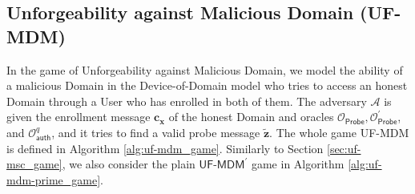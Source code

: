 \subsection{Unforgeability against Malicious Domain (UF-MDM)}
\label{sec:uf-mdm_game}

In the game of Unforgeability against Malicious Domain, we model the ability of a malicious \textsf{Domain} in the Device-of-Domain model who tries to access an honest \textsf{Domain} through a \textsf{User} who has enrolled in both of them.
The adversary $\mathcal{A}$ is given the enrollment message $\mathbf{c_x}$ of the honest \textsf{Domain} and oracles $\mathcal{O}_\textsf{Probe}, \mathcal{O}_\textsf{Probe}^\prime$, and $ \mathcal{O}_\textsf{auth}^q$, and it tries to find a valid probe message $\mathbf{\tilde{z}}$.
The whole game \textsf{UF-MDM} is defined in Algorithm \ref{alg:uf-mdm_game}. Similarly to Section \ref{sec:uf-msc_game}, we also consider the plain $\textsf{UF-MDM}^\prime$ game in Algorithm \ref{alg:uf-mdm-prime_game}.

